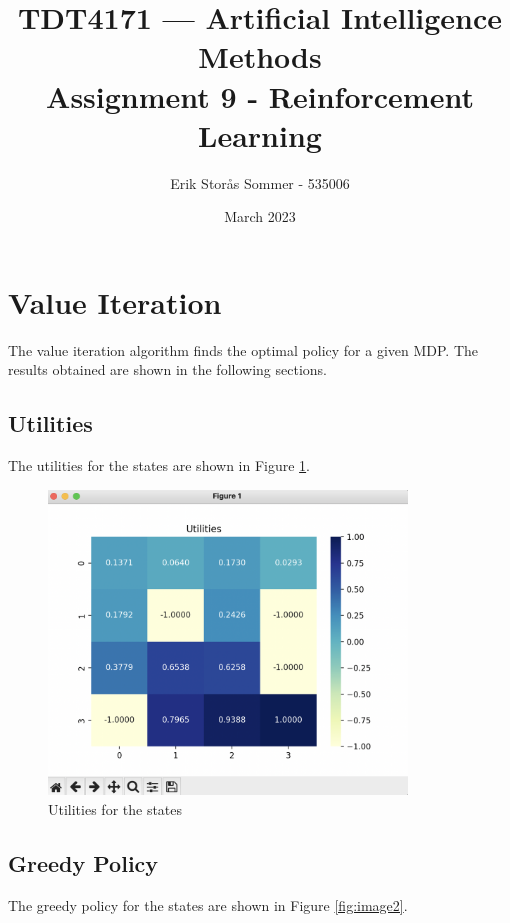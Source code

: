 \documentclass{article}
\title{TDT4171 — Artificial Intelligence Methods \\ Assignment 9 - Reinforcement Learning}
\author{Erik Storås Sommer - 535006}
\date{March 2023}
\begin{document}
\maketitle
\setlength{\parindent}{0pt}

\section*{Value Iteration}

The value iteration algorithm finds the optimal policy for a given MDP.
The results obtained are shown in the following sections.

\subsection*{Utilities}

The utilities for the states are shown in Figure \ref{fig:image1}.

\begin{figure}[hbtp]
    \centering
    \includegraphics[width=0.85\textwidth]{images/utilities.png}
    \caption{Utilities for the states}
    \label{fig:image1}
\end{figure}

\newpage

\subsection*{Greedy Policy}

The greedy policy for the states are shown in Figure \ref{fig:image2}.
\end{document}

